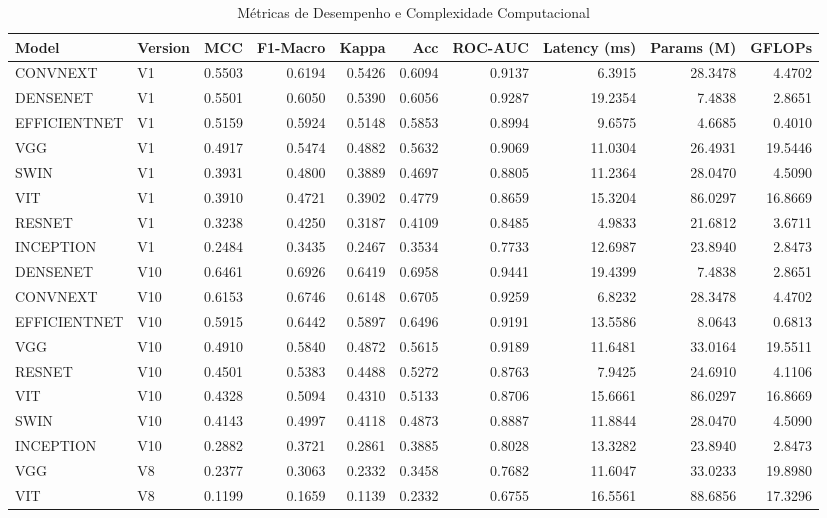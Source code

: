 \begin{table}
\caption{Métricas de Desempenho e Complexidade Computacional}
\label{tab:results_full_metrics}
\begin{tabular}{llrrrrrrrr}
\toprule
Model & Version & MCC & F1-Macro & Kappa & Acc & ROC-AUC & Latency (ms) & Params (M) & GFLOPs \\
\midrule
CONVNEXT & V1 & 0.5503 & 0.6194 & 0.5426 & 0.6094 & 0.9137 & 6.3915 & 28.3478 & 4.4702 \\
DENSENET & V1 & 0.5501 & 0.6050 & 0.5390 & 0.6056 & 0.9287 & 19.2354 & 7.4838 & 2.8651 \\
EFFICIENTNET & V1 & 0.5159 & 0.5924 & 0.5148 & 0.5853 & 0.8994 & 9.6575 & 4.6685 & 0.4010 \\
VGG & V1 & 0.4917 & 0.5474 & 0.4882 & 0.5632 & 0.9069 & 11.0304 & 26.4931 & 19.5446 \\
SWIN & V1 & 0.3931 & 0.4800 & 0.3889 & 0.4697 & 0.8805 & 11.2364 & 28.0470 & 4.5090 \\
VIT & V1 & 0.3910 & 0.4721 & 0.3902 & 0.4779 & 0.8659 & 15.3204 & 86.0297 & 16.8669 \\
RESNET & V1 & 0.3238 & 0.4250 & 0.3187 & 0.4109 & 0.8485 & 4.9833 & 21.6812 & 3.6711 \\
INCEPTION & V1 & 0.2484 & 0.3435 & 0.2467 & 0.3534 & 0.7733 & 12.6987 & 23.8940 & 2.8473 \\
DENSENET & V10 & 0.6461 & 0.6926 & 0.6419 & 0.6958 & 0.9441 & 19.4399 & 7.4838 & 2.8651 \\
CONVNEXT & V10 & 0.6153 & 0.6746 & 0.6148 & 0.6705 & 0.9259 & 6.8232 & 28.3478 & 4.4702 \\
EFFICIENTNET & V10 & 0.5915 & 0.6442 & 0.5897 & 0.6496 & 0.9191 & 13.5586 & 8.0643 & 0.6813 \\
VGG & V10 & 0.4910 & 0.5840 & 0.4872 & 0.5615 & 0.9189 & 11.6481 & 33.0164 & 19.5511 \\
RESNET & V10 & 0.4501 & 0.5383 & 0.4488 & 0.5272 & 0.8763 & 7.9425 & 24.6910 & 4.1106 \\
VIT & V10 & 0.4328 & 0.5094 & 0.4310 & 0.5133 & 0.8706 & 15.6661 & 86.0297 & 16.8669 \\
SWIN & V10 & 0.4143 & 0.4997 & 0.4118 & 0.4873 & 0.8887 & 11.8844 & 28.0470 & 4.5090 \\
INCEPTION & V10 & 0.2882 & 0.3721 & 0.2861 & 0.3885 & 0.8028 & 13.3282 & 23.8940 & 2.8473 \\
VGG & V8 & 0.2377 & 0.3063 & 0.2332 & 0.3458 & 0.7682 & 11.6047 & 33.0233 & 19.8980 \\
VIT & V8 & 0.1199 & 0.1659 & 0.1139 & 0.2332 & 0.6755 & 16.5561 & 88.6856 & 17.3296 \\

\end{tabular}
\end{table}
